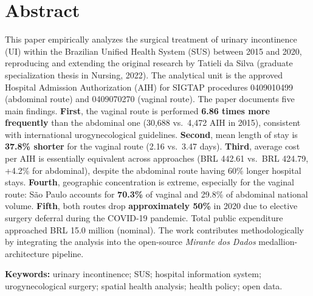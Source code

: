 \documentclass[12pt,a4paper,oneside]{article}
\begin{document}
\section*{Abstract}
\begin{singlespace}\small\noindent
This paper empirically analyzes the surgical treatment of urinary
incontinence (UI) within the Brazilian Unified Health System (SUS)
between 2015 and 2020, reproducing and extending the original research
by Tatieli da Silva (graduate specialization thesis in Nursing, 2022).
The analytical unit is the approved Hospital Admission Authorization
(AIH) for SIGTAP procedures 0409010499 (abdominal route) and
0409070270 (vaginal route). The paper documents five main findings.
\textbf{First}, the vaginal route is performed \textbf{6.86 times more
frequently} than the abdominal one (30,688 vs.\ 4,472 AIH in
2015), consistent with international urogynecological
guidelines. \textbf{Second}, mean length of stay is \textbf{37.8\%
shorter} for the vaginal route (2.16 vs.\ 3.47 days). \textbf{Third},
average cost per AIH is essentially equivalent across approaches
(BRL 442.61 vs.\ BRL 424.79, +4.2\% for abdominal), despite the
abdominal route having 60\% longer hospital stays. \textbf{Fourth},
geographic concentration is extreme, especially for the vaginal
route: São Paulo accounts for \textbf{70.3\%} of vaginal and 29.8\%
of abdominal national volume. \textbf{Fifth}, both routes drop
\textbf{approximately 50\%} in 2020 due to elective surgery deferral
during the COVID-19 pandemic. Total public expenditure approached
BRL 15.0 million (nominal). The work contributes methodologically by
integrating the analysis into the open-source \textit{Mirante dos
Dados} medallion-architecture pipeline.

\vspace{0.4cm}\noindent\textbf{Keywords:}
urinary incontinence; SUS; hospital information system; urogynecological
surgery; spatial health analysis; health policy; open data.
\end{singlespace}

\newpage

\renewcommand{\contentsname}{Sumário}
\tableofcontents

\newpage
\renewcommand{\listfigurename}{Lista de Figuras}
\listoffigures

\vspace{1cm}
\renewcommand{\listtablename}{Lista de Tabelas}
\listoftables
\end{document}
